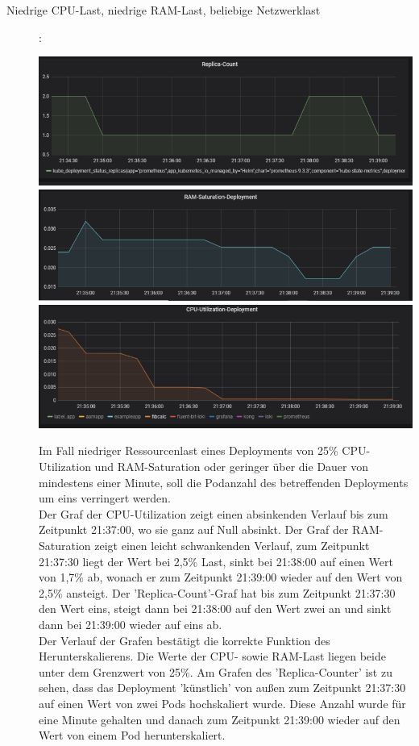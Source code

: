 \documentclass[a4paper,10pt]{scrartcl}
\begin{document}
\begin{description}

\item[Niedrige CPU-Last, niedrige RAM-Last, beliebige Netzwerklast]:\\

\begin{minipage}{\linewidth}
            \includegraphics[width=.5\textwidth]{img/Herunterskalieren/ReplicaCount.PNG}
            \includegraphics[scale=1,width=.5\textwidth,height=.14\textheight]{img/Herunterskalieren/RAMSaturation.PNG}
  			\includegraphics[scale=1,width=.5\textwidth]{img/Herunterskalieren/CPUSaturation.PNG}			
\end{minipage}

Im Fall niedriger Ressourcenlast eines Deployments von 25\% CPU-Utilization und RAM-Saturation oder geringer über die Dauer von mindestens einer Minute, soll die Podanzahl des betreffenden Deployments um eins verringert werden.\\
Der Graf der CPU-Utilization zeigt einen absinkenden Verlauf bis zum Zeitpunkt 21:37:00, wo sie ganz auf Null absinkt. Der Graf der RAM-Saturation zeigt einen leicht schwankenden Verlauf, zum Zeitpunkt 21:37:30 liegt der Wert bei 2,5\% Last, sinkt bei 21:38:00 auf einen Wert von 1,7\% ab, wonach er zum Zeitpunkt 21:39:00 wieder auf den Wert von 2,5\% ansteigt.
Der 'Replica-Count'-Graf hat bis zum Zeitpunkt 21:37:30 den Wert eins, steigt dann bei 21:38:00 auf den Wert zwei an und sinkt dann bei 21:39:00 wieder auf eins ab.\\
Der Verlauf der Grafen bestätigt die korrekte Funktion des Herunterskalierens. Die Werte der CPU- sowie RAM-Last liegen beide unter dem Grenzwert von 25\%. Am Grafen des 'Replica-Counter' ist zu sehen, dass das Deployment 'künstlich' von außen zum Zeitpunkt 21:37:30 auf einen Wert von zwei Pods hochskaliert wurde. Diese Anzahl wurde für eine Minute gehalten und danach zum Zeitpunkt 21:39:00 wieder auf den Wert von einem Pod herunterskaliert.

\end{description}
\end{document}
